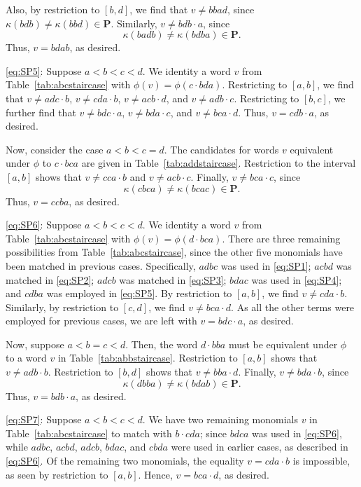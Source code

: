 \documentclass[12 pt]{amsart}
\newcommand{\Plactic}{{\mathbf{P}}}
\theoremstyle{remark}
\numberwithin{equation}{section}
\begin{document}
    Also, by restriction to $[b,d]$, we find that $v \neq bbad$, since $\kappa(bdb)\neq \kappa(bbd) \in \Plactic$. Similarly, $v \neq bdb\cdot a$, since 
    \[
    \kappa(badb) \neq \kappa(bdba) \in \Plactic.
    \]
    Thus, $v = bdab$, as desired.

        \medbreak
   \eqref{eq:SP5}:
    Suppose $a < b < c < d$. We identity a word $v$ from Table~\ref{tab:abcstaircase} with $\phi(v)  = \phi(c\cdot bda)$.
    Restricting to $[a,b]$, we find that $v \neq adc\cdot b$, $v\neq cda\cdot b$, $v\neq acb\cdot d$, and $v\neq adb\cdot c$. Restricting to $[b,c]$, we further find that $v\neq bdc\cdot a$, $v \neq bda\cdot c$, and $v \neq bca\cdot d.$
    Thus, $v = cdb\cdot a$, as desired. 

    Now, consider the case $a < b < c = d$. The candidates for words $v$ equivalent under $\phi$ to $c\cdot bca$ are given in Table~\ref{tab:addstaircase}.
    Restriction to the interval $[a,b]$ shows that $v \neq cca\cdot b$ and $v \neq acb\cdot c$. 
    Finally, $v \neq bca\cdot c$, since 
    \[
    \kappa(cbca) \neq \kappa(bcac) \in \Plactic.
    \] Thus, $v = ccba$, as desired.

        \medbreak
   \eqref{eq:SP6}:
    Suppose $a < b < c < d$. 
    We identity a word $v$ from Table~\ref{tab:abcstaircase} with $\phi(v)  = \phi(d\cdot bca)$.
    There are three remaining possibilities from Table~\ref{tab:abcstaircase}, since the other five monomials have been matched in previous cases. Specifically, $adbc$ was used in \eqref{eq:SP1}; $acbd$ was matched in \eqref{eq:SP2}; $adcb$ was matched in \eqref{eq:SP3}; $bdac$ was used in \eqref{eq:SP4}; and $cdba$ was employed in \eqref{eq:SP5}.  
    By restriction to $[a,b]$, we find $v\neq cda\cdot b$. Similarly, by restriction to $[c,d]$, we find $v \neq bca\cdot d$. As all the other terms were employed for previous cases, we are left with $v= bdc\cdot a$, as desired. 
    
    Now, suppose $a < b = c < d$. Then, the word $d\cdot bba$ must be equivalent under $\phi$ to a word $v$ in Table~\ref{tab:abbstaircase}.
    Restriction to  $[a,b]$ shows that $v \neq adb\cdot b$. Restriction to $[b,d]$ shows that $v \neq bba\cdot d$. Finally, $v \neq bda\cdot b$, since 
    \[
    \kappa(dbba) \neq \kappa(bdab) \in \Plactic.
    \] Thus, $v = bdb\cdot a$, as desired. 

        \medbreak
   \eqref{eq:SP7}:
   Suppose $a < b < c < d$.
    We have two remaining monomials $v$ in Table~\ref{tab:abcstaircase} to match with $b\cdot cda$; since $bdca$ was used in \eqref{eq:SP6}, while $adbc$, $acbd$, $adcb$, $bdac$, and $cbda$ were used in earlier cases, as described in \eqref{eq:SP6}. 
    Of the remaining two monomials, the equality $v= cda\cdot b$ is impossible, as seen by restriction to $[a,b].$ Hence, $v= bca\cdot d$, as desired.
    
\end{document}

